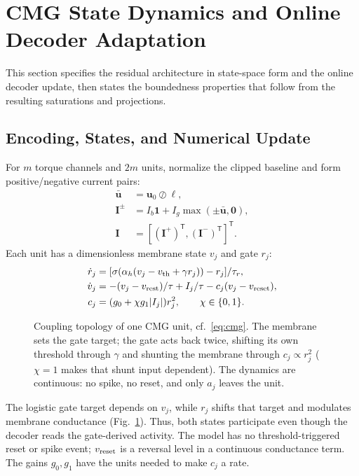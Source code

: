 \documentclass[letterpaper, 10 pt, conference]{ieeeconf}
\newcommand{\T}{^{\mathsf T}}
\begin{document}
\section{CMG State Dynamics and Online Decoder Adaptation}
\label{sec:architecture}
\label{sec:analysis}
This section specifies the residual architecture in state-space form and the online decoder update, then states the boundedness properties that follow from the resulting saturations and projections.
\subsection{Encoding, States, and Numerical Update}

For $m$ torque channels and $2m$ units, normalize the clipped baseline and
form positive/negative current pairs:
\begin{equation}
 \begin{aligned}
 \bar{\bm u}&=\bm u_0\oslash\bm\ell,\\
 \bm I^{\pm}&=I_b\bm1+I_g\max(\pm\bar{\bm u},\bm0),\\
 \bm I&=[(\bm I^+)\T,(\bm I^-)\T]\T.
 \end{aligned}
 \label{eq:encoding}
\end{equation}
Each unit has a dimensionless membrane state $v_j$ and gate $r_j$:
\begin{align}
 \dot r_j&=[\sigma(\alpha_h(v_j-v_{\rm th}+\gamma r_j))-r_j]/\tau_r,\\
 \dot v_j&=-(v_j-v_{\rm rest})/\tau+I_j/\tau-c_j(v_j-v_{\rm reset}),\\
 c_j&=(g_0+\chi g_1|I_j|)r_j^2,\qquad \chi\in\{0,1\}.
 \label{eq:cmg}
\end{align}
\begin{figure}[t]
\centering
\resizebox{0.86\columnwidth}{!}{}
\caption{Coupling topology of one CMG unit, cf.~\eqref{eq:cmg}. The
membrane sets the gate target; the gate acts back twice, shifting its own
threshold through $\gamma$ and shunting the membrane through
$c_j\propto r_j^2$ ($\chi=1$ makes that shunt input dependent). The
dynamics are continuous: no spike, no reset, and only $a_j$ leaves the
unit.}
\label{fig:cmgunit}
\end{figure}
%
The logistic gate target depends on $v_j$, while $r_j$ shifts that target
and modulates membrane conductance (Fig.~\ref{fig:cmgunit}). Thus, both states participate even
though the decoder reads the gate-derived activity. The model has no
threshold-triggered reset or spike event; $v_{\rm reset}$ is a reversal
level in a continuous conductance term. The gains $g_0,g_1$ have the units
needed to make $c_j$ a rate.
\end{document}
